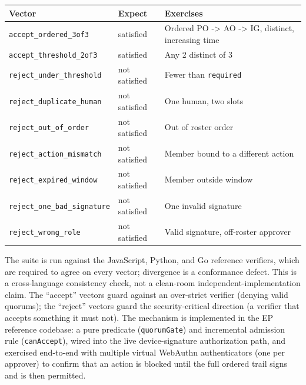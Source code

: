 \documentclass[
  11pt,
]{article}
\newcounter{none} %
\begin{document}
{\def\LTcaptype{none} %
\begin{longtable}[]{@{}
  >{\raggedright\arraybackslash}p{}
  >{\raggedright\arraybackslash}p{}
  >{\raggedright\arraybackslash}p{}@{}}
\toprule\noalign{}
\begin{minipage}[b]{\linewidth}\raggedright
Vector
\end{minipage} & \begin{minipage}[b]{\linewidth}\raggedright
Expect
\end{minipage} & \begin{minipage}[b]{\linewidth}\raggedright
Exercises
\end{minipage} \\
\midrule\noalign{}
\endhead
\bottomrule\noalign{}
\endlastfoot
\texttt{accept\_ordered\_3of3} & satisfied & Ordered PO -\textgreater{}
AO -\textgreater{} IG, distinct, increasing time \\
\texttt{accept\_threshold\_2of3} & satisfied & Any 2 distinct of 3 \\
\texttt{reject\_under\_threshold} & not satisfied & Fewer than
\texttt{required} \\
\texttt{reject\_duplicate\_human} & not satisfied & One human, two
slots \\
\texttt{reject\_out\_of\_order} & not satisfied & Out of roster order \\
\texttt{reject\_action\_mismatch} & not satisfied & Member bound to a
different action \\
\texttt{reject\_expired\_window} & not satisfied & Member outside
window \\
\texttt{reject\_one\_bad\_signature} & not satisfied & One invalid
signature \\
\texttt{reject\_wrong\_role} & not satisfied & Valid signature,
off-roster approver \\
\end{longtable}
}

The suite is run against the JavaScript, Python, and Go reference
verifiers, which are required to agree on every vector; divergence is a
conformance defect. This is a cross-language consistency check, not a
clean-room independent-implementation claim. The ``accept'' vectors guard
against an over-strict verifier (denying valid quorums); the ``reject''
vectors guard the security-critical direction (a verifier that accepts
something it must not). The mechanism is implemented in the EP reference
codebase: a pure predicate (\texttt{quorumGate}) and incremental
admission rule (\texttt{canAccept}), wired into the live
device-signature authorization path, and exercised end-to-end with
multiple virtual WebAuthn authenticators (one per approver) to confirm
that an action is blocked until the full ordered trail signs and is then
permitted.
\end{document}
